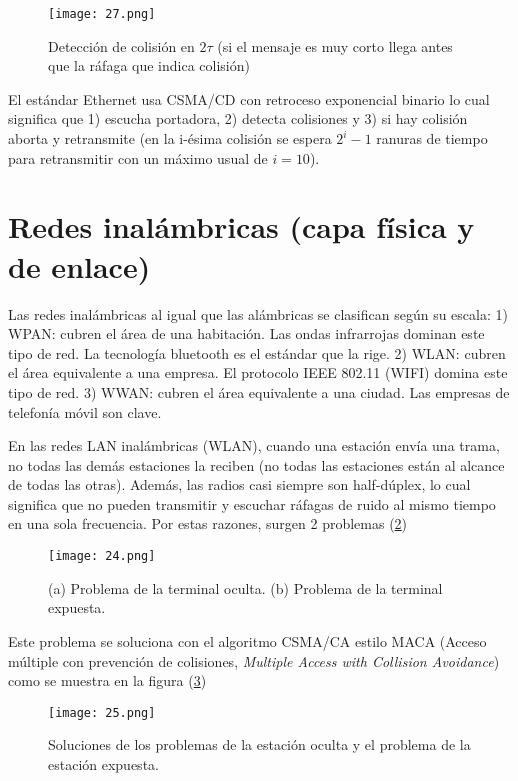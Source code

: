 \documentclass{book}
\begin{document}
	\begin{figure}[H]
		\centering
		\texttt{[image: 27.png]}
		\caption{Detección de colisión en $2\tau$ (si el mensaje es muy corto llega antes que la ráfaga que indica colisión)}
		\label{fig:dostau}
	\end{figure}
	
	El estándar Ethernet usa CSMA/CD con retroceso exponencial binario lo cual significa que 1) escucha portadora, 2) detecta colisiones y 3) si hay colisión aborta y retransmite (en la i-ésima colisión se espera $2^{i} - 1$ ranuras de tiempo para retransmitir con un máximo usual de $i = 10$).
	
	\section{Redes inalámbricas (capa física y de enlace)}
	Las redes inalámbricas al igual que las alámbricas se clasifican según su escala: 1) WPAN: cubren el área de una habitación. Las ondas infrarrojas dominan este tipo de red. La tecnología bluetooth es el estándar que la rige. 2) WLAN: cubren el área equivalente a una empresa. El protocolo IEEE 802.11 (WIFI) domina este tipo de red. 3) WWAN: cubren el área equivalente a una ciudad. Las empresas de telefonía móvil son clave.
	
	\vspace{3mm}
	En las redes LAN inalámbricas (WLAN), cuando una estación envía una trama, no todas las demás estaciones la reciben (no todas las estaciones están al alcance de todas las otras). Además, las radios casi siempre son half-dúplex, lo cual significa que no pueden transmitir y escuchar ráfagas de ruido al mismo tiempo en una sola frecuencia. Por estas razones, surgen 2 problemas (\ref{fig:OcultaExpuesta})
	
	\begin{figure}[H]
		\centering
		\texttt{[image: 24.png]}
		\caption{(a) Problema de la terminal oculta. (b) Problema de la terminal expuesta.}
		\label{fig:OcultaExpuesta}
	\end{figure}
	
	Este problema se soluciona con el algoritmo CSMA/CA estilo MACA (Acceso múltiple con prevención de colisiones, \textit{Multiple Access with Collision Avoidance}) como se muestra en la figura (\ref{fig:OcultaExpuestaResolucion})
	
	\begin{figure}[H]
		\centering
		\texttt{[image: 25.png]}
		\caption{Soluciones de los problemas de la estación oculta y el problema de la estación expuesta.}
		\label{fig:OcultaExpuestaResolucion}
	\end{figure}
	
\end{document}
